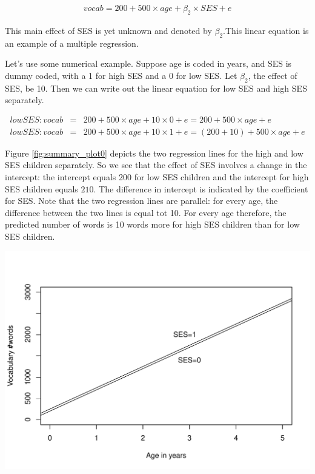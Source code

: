 \documentclass[]{report}\usepackage[]{graphicx}\usepackage[]{color}
\makeatletter
\def\maxwidth{ %
  \ifdim\Gin@nat@width>\linewidth
    \linewidth
  \else
    \Gin@nat@width
  \fi
}
\newenvironment{knitrout}{}{} %
\makeatother
\begin{document}
\begin{eqnarray}
vocab = 200 + 500 \times age + \beta_2 \times SES + e
\end{eqnarray}

This main effect of SES is yet unknown and denoted by $\beta_2$.This linear equation is an example of a multiple regression. 


Let's use some numerical example. Suppose age is coded in years, and SES is dummy coded, with a 1 for high SES and a 0 for low SES. Let $\beta_2$, the effect of SES, be 10. Then we can write out the linear equation for low SES and high SES separately.


\begin{eqnarray}
low SES: vocab &=& 200 + 500 \times age + 10 \times 0 + e = 200 + 500 \times age + e\\
low SES: vocab &=& 200 + 500 \times age + 10 \times 1 + e = (200+10) + 500 \times age  + e 
\end{eqnarray}

Figure \ref{fig:summary_plot0} depicts the two regression lines for the high and low SES children separately. So we see that the effect of SES involves a change in the intercept: the intercept equals 200 for low SES children and the intercept for high SES children equals $210$. The difference in intercept is indicated by the coefficient for SES. Note that the two regression lines are parallel: for every age, the difference between the two lines is equal tot 10. For every age therefore, the predicted number of words is 10 words more for high SES children than for low SES children.  


\begin{knitrout}
\color{fgcolor}
\includegraphics[width=\maxwidth]{figure/summary_plot0-1} 

\end{knitrout}
\end{document}
